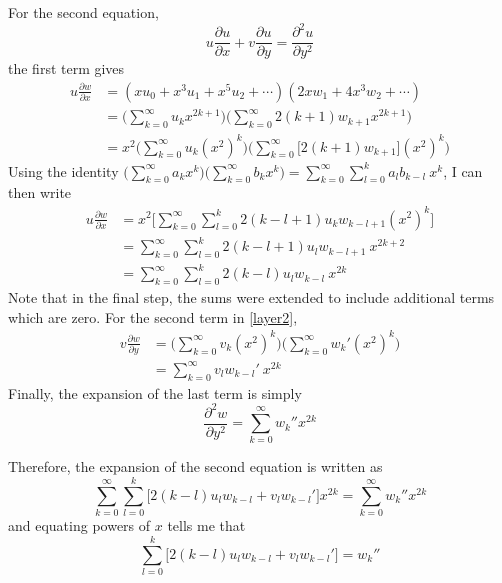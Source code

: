 \documentclass[10pt,a4paper]{report}
\begin{document}
For the second equation,
\begin{equation}\label{layer2}
u \frac{\partial u}{\partial x} + v \frac{\partial u}{\partial y} = \frac{\partial^2 u}{\partial y^2}
\end{equation}
the first term gives
\begin{align*}
u \frac{\partial w}{\partial x} & = (xu_0 + x^3 u_1 + x^5 u_2 + \dotsb)(2 x w_1 + 4 x^3 w_2 + \dotsb) \\
 & = \Bigg(\sum_{k=0}^\infty u_k x^{2k+1} \Bigg) \Bigg(\sum_{k=0}^\infty 2(k+1)w_{k+1} x^{2k+1} \Bigg) \\
 & = x^2 \Bigg(\sum_{k=0}^\infty u_k (x^2)^k \Bigg) \Bigg(\sum_{k=0}^\infty \big[ 2(k+1)w_{k+1} \big] (x^2)^k \Bigg)
\end{align*}
Using the identity $\big(\sum_{k=0}^\infty a_k x^k \big) \big( \sum_{k=0}^\infty b_k x^k  \big) = \sum_{k=0}^\infty \sum_{l=0}^k a_l b_{k-l} \ x^k$, I can then write
\begin{align*}
u \frac{\partial w}{\partial x} & = x^2 \Bigg[\sum_{k=0}^\infty \sum_{l=0}^k 2(k-l+1) u_k w_{k-l+1} (x^2)^k \Bigg] \\
 & = \sum_{k=0}^\infty \sum_{l=0}^k 2(k-l+1) u_l w_{k-l+1} \ x^{2k+2} \\
 & = \sum_{k=0}^\infty \sum_{l=0}^{k} 2(k-l) u_l w_{k-l} \ x^{2k}
\end{align*}
Note that in the final step, the sums were extended to include additional terms which are zero. For the second term in \eqref{layer2},
\begin{align*}
v \frac{\partial w}{\partial y} & = \Bigg(\sum_{k=0}^\infty v_k (x^2)^k \Bigg) \Bigg(\sum_{k=0}^\infty w_k' (x^2)^k \Bigg) \\
& = \sum_{k=0}^\infty v_l w_{k-l}' \ x^{2k}
\end{align*}
Finally, the expansion of the last term is simply
\begin{equation*}
\frac{\partial^2 w}{\partial y^2} = \sum_{k=0}^\infty w_k'' x^{2k}
\end{equation*}

Therefore, the expansion of the second equation is written as
\begin{equation*}
\sum_{k=0}^\infty \sum_{l=0}^{k} \bigg[ 2(k-l)u_l w_{k-l} + v_l w_{k-l}' \bigg] x^{2k} = \sum_{k=0}^\infty w_k'' x^{2k}
\end{equation*}
and equating powers of $x$ tells me that
\begin{equation}
\sum_{l=0}^k \Big[2(k-l) u_l w_{k-l} + v_l w_{k-l}' \Big] = w_k''
\end{equation}
\end{document}
